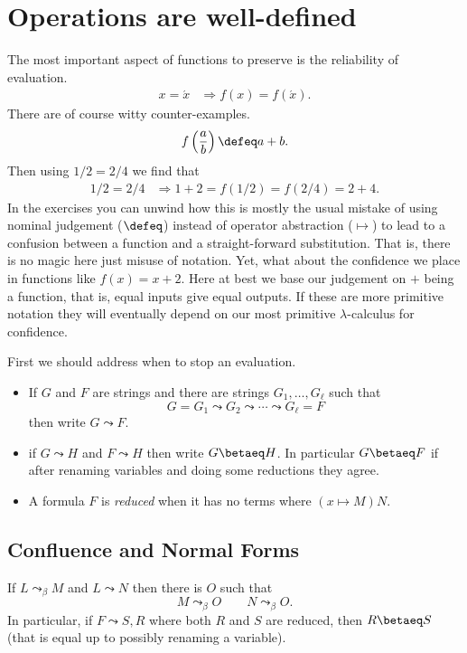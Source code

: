 
\section{Operations are well-defined}
The most important aspect of functions to preserve is the reliability of evaluation.
\begin{align*}
    x=\acute{x} & \Rightarrow f(x)=f(\acute{x}).
\end{align*}
There are of course witty counter-examples.
\begin{align*}
    f\left(\frac{a}{b}\right)\defeq a+b.
\end{align*}
Then using $1/2=2/4$ we find that
\begin{align*}
    1/2 = 2/4 & \Rightarrow 1+2=f(1/2)=f(2/4)=2+4.
\end{align*}
In the exercises you can unwind how this is mostly the 
usual mistake of using nominal judgement ($\defeq$) 
instead of operator abstraction ($\mapsto$) to lead 
to a confusion between a function and a straight-forward substitution.
That is, there is no magic here just misuse of notation.
Yet, what about the confidence we place in functions like $f(x)=x+2$.
Here at best we base our judgement on $+$ being a function, that is, 
equal inputs give equal outputs.  If these are more primitive notation 
they will eventually depend on our most primitive $\lambda$-calculus 
for confidence.

First we should address when to stop an evaluation.
\begin{definition}
    \begin{itemize}
        \item If $G$ and $F$ are strings and there are strings 
        $G_1,\ldots,G_{\ell}$ such that 
        \[ G=G_1 \leadsto G_2 \leadsto\cdots\leadsto G_{\ell}=F\]
        then write $G\leadsto F$.

        \item if $G\leadsto H$ and $F\leadsto H$ then write $G\betaeq H$.
        In particular $G\betaeq F$ if after renaming variables and doing some reductions 
        they agree.

        \item A formula $F$ is \emph{reduced} when it has no terms where 
        $(x\mapsto M)N$.  
    
    \end{itemize}
    
\end{definition}

\subsection{Confluence and Normal Forms}
\begin{theorem}
    If $L\leadsto_{\beta} M$ and $L\leadsto N$ then there is $O$ such that 
    \[M\leadsto_{\beta} O\qquad N\leadsto_{\beta} O.\] 
    In particular, if $F\leadsto S,R$ where both $R$ and $S$ are reduced,
    then $R\betaeq S$ (that is equal up to possibly renaming a variable).
\end{theorem}

